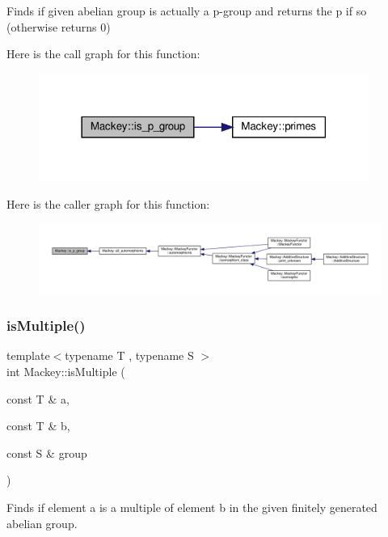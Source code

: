 Finds if given abelian group is actually a p-\/group and returns the p if so (otherwise returns 0) 

Here is the call graph for this function\+:\nopagebreak
\begin{figure}[H]
\begin{center}
\leavevmode
\includegraphics[width=306pt]{namespaceMackey_a2b6ac22efe0be546f2c3f8abc2ceb5b7_cgraph}
\end{center}
\end{figure}
Here is the caller graph for this function\+:\nopagebreak
\begin{figure}[H]
\begin{center}
\leavevmode
\includegraphics[width=350pt]{namespaceMackey_a2b6ac22efe0be546f2c3f8abc2ceb5b7_icgraph}
\end{center}
\end{figure}
\mbox{\label{namespaceMackey_aef81f82c080c97bb31154524af52b62c}} 
\subsubsection{\texorpdfstring{is\+Multiple()}{isMultiple()}}
{\footnotesize\ttfamily template$<$typename T , typename S $>$ \\
int Mackey\+::is\+Multiple (\begin{DoxyParamCaption}\item[{const T \&}]{a,  }\item[{const T \&}]{b,  }\item[{const S \&}]{group }\end{DoxyParamCaption})}



Finds if element a is a multiple of element b in the given finitely generated abelian group. 

